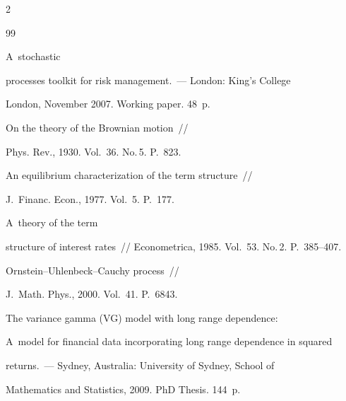 \begin{multicols}{2}
{{\begin{thebibliography}{99}


     A~stochastic 


processes toolkit for risk management.~--- London: King's College 


London, November 2007.  Working paper. 48~p.










 On the theory of the Brownian motion~// 


Phys. Rev., 1930. Vol.~36. No.\,5. P.~823.


    




     An equilibrium characterization of the term structure~// 


J.~Financ. Econ., 1977. Vol.~5. P.~177.







         A~theory of the term 


structure of interest rates~//  Econometrica, 1985. Vol.~53. No.\,2.  P.~385--407.













     Ornstein--Uhlenbeck--Cauchy process~// 


J.~Math. Phys., 2000. Vol.~41. P.~6843.







     The variance gamma (VG) model with long range dependence: 


A~model for financial data incorporating long range dependence in squared 


returns.~--- Sydney, Australia: University of Sydney, School of 


Mathematics and Statistics, 2009. PhD Thesis. 144~p.






\end{thebibliography}}}
\end{multicols}
